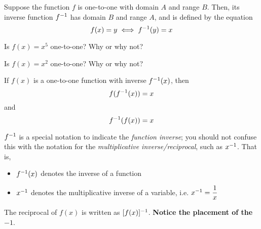 \documentclass[notes]{subfiles}
\begin{document}
		\begin{defn}
			Suppose the function \(f\) is one-to-one with domain \(A\) and range \(B\). Then, its inverse function \(f^{-1}\) has domain \(B\) and range \(A\), and is defined by the equation
				\[f(x) = y\iff f^{-1}(y) = x\]
		\end{defn}
		
		\begin{ex}
			Is \(f(x) = x^5\) one-to-one?  Why or why not?
		\end{ex}
			
		\begin{ex}
			Is \(f(x) = x^2\) one-to-one?  Why or why not?
		\end{ex}
			\newpage
		
		\begin{rmk}
			If \(f(x)\) is a one-to-one function with inverse \(f^{-1}(x)\), then
				\[f(f^{-1}(x)) = x\]
			and
				\[f^{-1}(f(x)) = x\]
		\end{rmk}
		
		\begin{rmk}
			\(f^{-1}\) is a special notation to indicate the \emph{function inverse}; you should not confuse this with the notation for the \emph{multiplicative inverse/reciprocal}, such as \(x^{-1}\).  That is, 
			\begin{itemize}
				\item \(f^{-1}(x)\) denotes the inverse of a function
				\item \(x^{-1}\) denotes the multiplicative inverse of a variable, i.e. \(x^{-1} = \dfrac{1}{x}\)
			\end{itemize}
			The reciprocal of \(f(x)\) is written as \([f(x)]^{-1}\).  \textbf{Notice the placement of the} \(-1\).
		\end{rmk}
		
\end{document}
